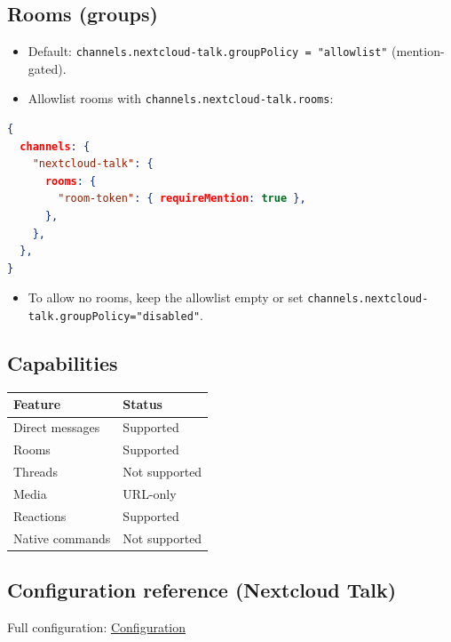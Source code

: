 \subsection{Rooms (groups)}


\begin{itemize}
  \item Default: \texttt{channels.nextcloud-talk.groupPolicy = "allowlist"} (mention-gated).
  \item Allowlist rooms with \texttt{channels.nextcloud-talk.rooms}:
\end{itemize}


\begin{lstlisting}[language=json]
{
  channels: {
    "nextcloud-talk": {
      rooms: {
        "room-token": { requireMention: true },
      },
    },
  },
}
\end{lstlisting}


\begin{itemize}
  \item To allow no rooms, keep the allowlist empty or set \texttt{channels.nextcloud-talk.groupPolicy="disabled"}.
\end{itemize}


\subsection{Capabilities}



\begin{table}[h]
\centering
\small
\begin{tabular}{|l|l|}
\hline
Feature & Status \\
\hline
Direct messages & Supported \\
\hline
Rooms & Supported \\
\hline
Threads & Not supported \\
\hline
Media & URL-only \\
\hline
Reactions & Supported \\
\hline
Native commands & Not supported \\
\hline
\end{tabular}
\end{table}



\subsection{Configuration reference (Nextcloud Talk)}


Full configuration: \href{/gateway/configuration}{Configuration}

